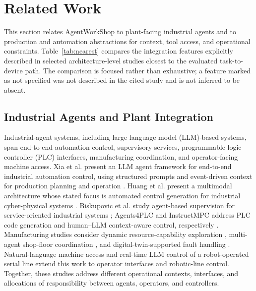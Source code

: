 \section{Related Work}
\label{sec:related}
This section relates AgentWorkShop to plant-facing industrial agents and to
production and automation abstractions for context, tool access, and
operational constraints. Table~\ref{tab:nearest} compares the integration
features explicitly described in selected architecture-level studies closest
to the evaluated task-to-device path. The comparison is focused rather than
exhaustive; a feature marked as not specified was not described in the cited
study and is not inferred to be absent.

\subsection{Industrial Agents and Plant Integration}
Industrial-agent systems, including large language model (LLM)-based systems,
span end-to-end automation control, supervisory
services, programmable logic controller (PLC) interfaces, manufacturing
coordination, and operator-facing machine access. Xia et al. present an
LLM agent framework for end-to-end industrial automation control, using
structured prompts and event-driven context for production planning and
operation \cite{xia2025control}. Huang et al. present a multimodal
architecture whose stated focus is automated control generation for
industrial cyber-physical systems \cite{huang2026made}. Biskupovic et al.
study agent-based supervision for service-oriented industrial systems
\cite{biskupovic2025supervision};
Agents4PLC and InstructMPC address PLC code generation and human--LLM
context-aware control, respectively
\cite{liu2026agents4plc,wu2025instructmpc}. Manufacturing studies consider
dynamic resource-capability exploration \cite{lim2025llmenabled}, multi-agent
shop-floor coordination \cite{zhao2026shopfloor}, and digital-twin-supported
fault handling \cite{gill2025llmdt}. Natural-language machine access
\cite{hofmann2025nlc} and real-time LLM control of a robot-operated serial
line \cite{waseem2026pretrained} extend this work to operator interfaces and
robotic-line control. Together, these studies address different operational
contexts, interfaces, and allocations of responsibility between agents,
operators, and controllers.

